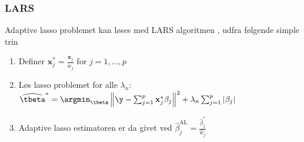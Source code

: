 \subsubsection{LARS}
Adaptive lasso problemet kan løses med LARS algoritmen \citep{efron}, udfra følgende simple trin
\begin{enumerate}
\item Definer \(\mathbf{x}_j^{*} = \frac{\mathbf{x}_j}{\widehat{w}_j}\) for \(j=1, \ldots, p\)
\item Løs lasso problemet for alle \(\lambda_n\): \(\widehat{\tbeta}^{*} = \argmin_{\tbeta} \left\Vert \y - \sum_{j=1}^p \mathbf{x}_j^{*} \beta_j \right\Vert^2 + \lambda_n \sum_{j=1}^p \vert \beta_j \vert\)
\item Adaptive lasso estimatoren er da givet ved \(\widehat{\beta}_j^{\text{AL}} = \frac{\widehat{\beta}_j^{*}}{\widehat{w}_j}\)
\end{enumerate}
%
%